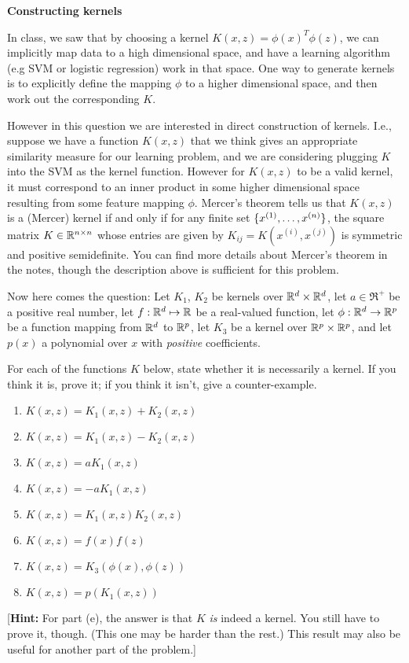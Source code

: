 \item {} {\bf Constructing kernels}

In class, we saw that by choosing a kernel $K(x,z) = \phi(x)^T\phi(z)$, we can
implicitly map data to a high dimensional space, and have a learning algorithm (e.g SVM or logistic regression)
work in that space. One way to generate kernels is to explicitly define the
mapping $\phi$ to a higher dimensional space, and then work out the
corresponding $K$.

However in this question we are interested in direct construction of kernels.
I.e., suppose we have a function $K(x,z)$ that we think gives an appropriate
similarity measure for our learning problem, and we are considering plugging
$K$ into the SVM as the kernel function. However for $K(x,z)$ to be a valid
kernel, it must correspond to an inner product in some higher dimensional space
resulting from some feature mapping $\phi$.  Mercer's theorem tells us that
$K(x,z)$ is a (Mercer) kernel if and only if for any finite set $\{x^{(1)},
\ldots, x^{({n})}\}$, the square matrix $K \in {\mathbb R}^{{n} \times {n}}$ whose entries
are given by $K_{ij} = K(x^{(i)},x^{(j)})$ is symmetric and positive
semidefinite. You can find more details about Mercer's theorem in the notes,
though the description above is sufficient for this problem.

Now here comes the question: Let $K_1$, $K_2$ be kernels over ${\mathbb R}^{{d}} \times
{\mathbb R}^{{d}}$, let $a \in \Re^+$ be a positive real number, let $f : {\mathbb R}^{{d}} \mapsto
{\mathbb R}$ be a real-valued function, let $\phi: {\mathbb R}^{{d}} \rightarrow {\mathbb R}^{p}$ be a
function mapping from ${\mathbb R}^{{d}}$ to ${\mathbb R}^{p}$, let $K_3$ be a kernel over ${\mathbb R}^{p}
\times {\mathbb R}^{p}$, and let $p(x)$ a polynomial over $x$ with \emph{positive}
coefficients.

For each of the functions $K$ below, state whether it is necessarily a
kernel.  If you think it is, prove it; if you think it isn't, give a
counter-example.

\begin{enumerate}

\item {} $K(x,z) = K_1(x,z) + K_2(x,z)$
\item {} $K(x,z) = K_1(x,z) - K_2(x,z)$
\item {} $K(x,z) = a K_1(x,z)$
\item {} $K(x,z) = -a K_1(x,z)$
\item {} $K(x,z) = K_1(x,z)K_2(x,z)$
\item {} $K(x,z) = f(x)f(z)$
\item {} $K(x,z) = K_3(\phi(x),\phi(z))$
\item {} $K(x,z) = p(K_1(x,z))$

\end{enumerate}

[\textbf{Hint:} For part (e), the answer is that $K$ \emph{is} indeed
a kernel. You still have to prove it, though.  (This one may be harder than the
rest.)  This result may also be useful for another part of the problem.]

\ifnum{} {
  
} \fi
